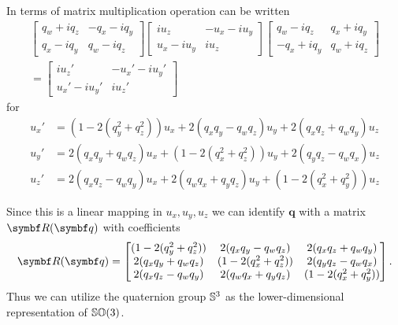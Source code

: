 In terms of matrix multiplication operation can be written
\begin{equation}
  \begin{aligned}
    \begin{bmatrix}
      q_w + i q_z & -q_x - i q_y \\
      q_x - i q_y & q_w - i q_z
    \end{bmatrix} \begin{bmatrix}
      i u_z       & -u_x - i u_y \\
      u_x - i u_y & i u_z
    \end{bmatrix} \begin{bmatrix}
      q_w - i q_z   & q_x + i q_y \\
      - q_x + i q_y & q_w + i q_z
    \end{bmatrix} \\
    = \begin{bmatrix}
      i u_z'        & -u_x' - i u_y' \\
      u_x' - i u_y' & i u_z'
    \end{bmatrix}
  \end{aligned}
\end{equation}
for
\begin{equation}
  \begin{aligned}
    u_x' & = (1 - 2(q_y^2 + q_z^2)) u_x + 2(q_x q_y - q_w q_z) u_y + 2( q_x q_z + q_w q_y ) u_z   \\
    u_y' & = 2(q_x q_y + q_w q_z) u_x + (1 - 2 (q_x^2 + q_z^2)) u_y + 2( q_y q_z-q_w q_x) u_z     \\
    u_z' & = 2 (q_x q_z  - q_w q_y) u_x  + 2 (q_w q_x + q_y q_z) u_y + (1 - 2(q_x^2 + q_y^2)) u_z
  \end{aligned}
\end{equation}

Since this is a linear mapping in $u_x, u_y, u_z$ we can identify $\symbf{q}$ with a matrix $\bR(\bq)$ with coefficients
\begin{equation}
  \bR(\bq) = \begin{bmatrix}
    (1 - 2(q_y^2 + q_z^2)) & 2(q_x q_y - q_w q_z)    & 2( q_x q_z + q_w q_y ) \\
    2(q_x q_y + q_w q_z)   & (1 - 2 (q_x^2 + q_z^2)) & 2( q_y q_z-q_w q_x)    \\
    2 (q_x q_z  - q_w q_y) & 2 (q_w q_x + q_y q_z)   & (1 - 2(q_x^2 + q_y^2))
  \end{bmatrix}.
\end{equation}
Thus we can utilize the quaternion group ${\mathbb{S}^3}$ as the lower-dimensional representation of ${\mathbb{SO}(3)}$.

